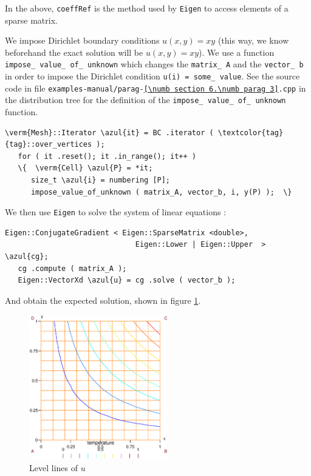 In the above, {\small\tt coeffRef} is the method used by {\small\tt Eigen} to access elements of
a sparse matrix.

We impose Dirichlet boundary conditions $ u(x,y) = xy $ (this way, we know beforehand
the exact solution will be $ u(x,y) = xy $).
We use a function {\small\tt impose\_\,value\_\,of\_\,unknown} which changes the {\small\tt matrix\_\,A}
and the {\small\tt vector\_\,b} in order to impose the Dirichlet condition {\small\tt u(i) = 
some\_\,value}.
See the source code in file {\small\tt examples-manual/parag-\ref{\numb section 6.\numb parag 3}.cpp}
in the distribution tree for the definition of the {\small\tt impose\_\,value\_\,of\_\,unknown}
function.

\begin{Verbatim}[commandchars=\\\{\},formatcom=\small\tt,frame=single,
   label=parag-\ref{\numb section 6.\numb parag 3}.cpp,rulecolor=\color{moldura},
   baselinestretch=0.94,framesep=2mm                                            ]
   \verm{Mesh}::Iterator \azul{it} = BC .iterator ( \textcolor{tag}{tag}::over_vertices );
   for ( it .reset(); it .in_range(); it++ )
   \{  \verm{Cell} \azul{P} = *it;
      size_t \azul{i} = numbering [P];
      impose_value_of_unknown ( matrix_A, vector_b, i, y(P) );  \}
\end{Verbatim}

We then use {\small\tt Eigen} to solve the system of linear equations :

\begin{Verbatim}[commandchars=\\\{\},formatcom=\small\tt,frame=single,
   label=parag-\ref{\numb section 6.\numb parag 3}.cpp,rulecolor=\color{moldura},
   baselinestretch=0.94,framesep=2mm                                            ]
   Eigen::ConjugateGradient < Eigen::SparseMatrix <double>,
                              Eigen::Lower | Eigen::Upper  > \azul{cg};
   cg .compute ( matrix_A );
   Eigen::VectorXd \azul{u} = cg .solve ( vector_b );
\end{Verbatim}

And obtain the expected solution, shown in figure \ref{\numb section 6.\numb fig 1}.

\begin{figure} \centering
  \includegraphics[width=60mm]{square-Dirichlet}
  \caption{Level lines of $u$}
  \label{\numb section 6.\numb fig 1}
\end{figure}

